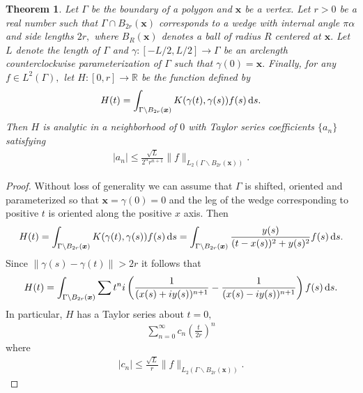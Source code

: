 \documentclass[12pt]{article}
\newcommand{\bx}{\boldsymbol{x}}
\newtheorem{theorem}{Theorem}
\begin{document}
\begin{theorem}
Let $\Gamma$ be the boundary of a polygon and $\bx$ be a vertex. Let $r>0$ be a real number such that $\Gamma \cap B_{2r}(\bx)$ corresponds to a wedge with internal angle $\pi \alpha$ and side lengths $2r,$ where $B_R(\bx)$ denotes a ball of radius $R$ centered at $\bx.$ Let $L$ denote the length of $\Gamma$ and $\gamma: [-L/2,L/2]\to \Gamma$ be an arclength counterclockwise parameterization of $\Gamma$ such that $\gamma(0) = \bx.$ Finally, for any $f \in L^2(\Gamma),$ let $H:[0,r] \to \mathbb{R}$ be the function defined by
\begin{align}
H(t) = \int_{\Gamma\backslash B_{2r}(\bx)} K(\gamma(t),\gamma(s)) f(s)\,{\rm d}s.
\end{align}
Then $H$ is analytic in a neighborhood of $0$ with Taylor series coefficients $\{ a_n\}$ satisfying
\begin{align}
|a_n| \le \frac{\sqrt{L}}{2^nr^{n+1}} \|f\|_{L_2(\Gamma \backslash B_{2r}(\bx))}.
\end{align}
\end{theorem}
\begin{proof}
Without loss of generality we can assume that $\Gamma$ is shifted, oriented and parameterized so that $\bx = \gamma(0)= 0$ and the leg of the wedge corresponding to positive $t$ is oriented along the positive $x$ axis. Then
\begin{align}
H(t) = \int_{\Gamma\backslash B_{2r}(\bx)} K(\gamma(t),\gamma(s)) f(s)\,{\rm d}s = \int_{\Gamma\backslash B_{2r}(\bx)} \frac{y(s)}{(t-x(s))^2+y(s)^2}f(s)\,{\rm d}s.
\end{align}
Since $\|\gamma(s)-\gamma(t)\| >2r$ it follows that
\begin{align}
H(t) =\int _{\Gamma\backslash B_{2r}(\bx)}\sum {t^n i}\left(\frac{1}{(x(s)+i y(s))^{n+1}}-\frac{1}{(x(s)-i y(s))^{n+1}} \right) f(s)\,{\rm d}s.
\end{align}
In particular, $H$ has a Taylor series about $t=0,$
\begin{align}
\sum_{n=0}^\infty c_n \left(\frac{t}{2r}\right)^n
\end{align}
where
\begin{align}
|c_n| \le  \frac{\sqrt{L}}{r} \|f\|_{L_2(\Gamma \backslash B_{2r}(\bx))}.
\end{align}
\end{proof}
\end{document}
